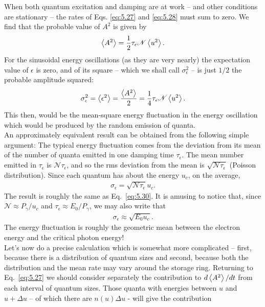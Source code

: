 When both quantum excitation and damping are at work -- and other conditions are
stationary -- the rates of Eqs. \eqref{eq:5.27} and \eqref{eq:5.28} must sum to zero. We find that the probable value of $A^2$ is given by
\begin{align}
	\left< A^2 \right> = \dfrac{1}{2} \tau_\epsilon \mathscr{N} \left< u^2 \right>.
\end{align}
For the sinusoidal energy oscillations (as they are very nearly) the expectation value of $\epsilon$ is zero, and of its square -- which we shall call $\sigma_\epsilon^2$ -- is just $1/2$ the probable amplitude squared:
\begin{align}\label{eq:5.30}
	\sigma_\epsilon^2 = \left< \epsilon^2 \right> = \dfrac{\left< A^2 \right>}{2} = \dfrac{1}{4} \tau_\epsilon \mathscr{N} \left< u^2 \right>.
\end{align}
This then, would be the mean-square energy fluctuation in the energy oscillation which would be produced by the random emission of quanta.\\
An approximately equivalent result can be obtained from the following simple argument: The typical energy fluctuation comes from the deviation from its mean of the number of quanta emitted in one damping time $\tau_\epsilon$. The mean number emitted in $\tau_\epsilon$ is $\mathscr{N}\tau_\epsilon$, and so the rms deviation from the mean is $\sqrt{\mathscr{N}\tau_\epsilon}$ (Poisson distribution). Since each quantum has about the energy $u_c$, on the average,
\begin{align}
	\sigma_\epsilon = \sqrt{\mathscr{N}\tau_\epsilon} u_c.
\end{align}
The result is roughly the same as Eq.~\eqref{eq:5.30}. It is amusing to notice that, since $\mathscr{N} \approx P_\gamma/u_c$ and $\tau_\epsilon \approx E_0/P_\gamma$, we may also write that
\begin{align} \label{eq:5.32}
	\sigma_\epsilon \approx \sqrt{E_0 u_c}.
\end{align}
The energy fluctuation is roughly the geometric mean between the electron energy and the critical
 photon energy!\\
Let's now do a precise calculation which is somewhat more complicated -- first, because there is a distribution of quantum sizes and second, because both the distribution and the mean rate may vary around the storage ring. Returning to Eq.~\eqref{eq:5.27} we should consider separately the contribution to $d\left< A^2 \right>/dt$ from each interval of quantum sizes. Those quanta with energies between $u$ and $u + \Delta u$ -- of which there are $n(u)\Delta u$ - will give the contribution
